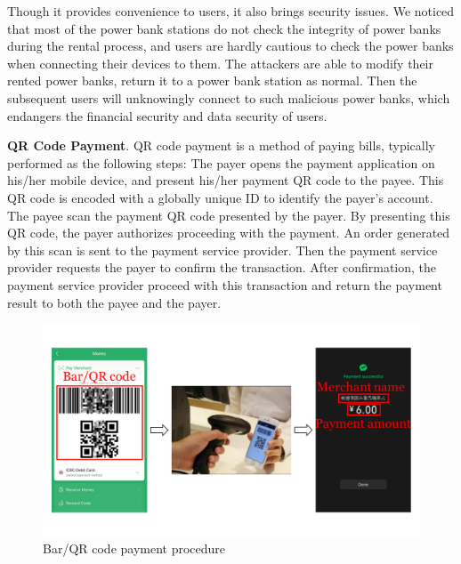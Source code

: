 

Though it provides convenience to users, it also brings security issues. 
We noticed that most of the power bank stations do not check the integrity of power banks during the rental process, and users are hardly cautious to check the power banks when connecting their devices to them. 
The attackers are able to modify their rented power banks, return it to a power bank station as normal.
Then the subsequent users will unknowingly connect to such malicious power banks, which endangers the financial security and data security of users.


\textbf{QR Code Payment}. 
QR code payment is a method of paying bills, typically performed as the following steps:
 The payer opens the payment application on his/her mobile device, and present his/her payment QR code to the payee. 
This QR code is encoded with a globally unique ID to identify the payer's account. 
 The payee scan the payment QR code presented by the payer. 
By presenting this QR code, the payer authorizes proceeding with the payment.
 An order generated by this scan is sent to the payment service provider. 
Then the payment service provider requests the payer to confirm the transaction.
 After confirmation, the payment service provider proceed with this transaction and return the payment result to both the payee and the payer.

\begin{figure}[t]
	\centering
	\includegraphics[width=\linewidth]{./Figs/qr_code_payment.png}
	\caption{Bar/QR code payment procedure}
	\label{fig:qr_payment_procedure}
\end{figure}


